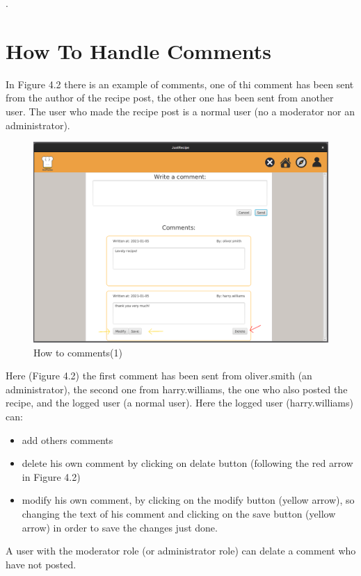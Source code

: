 \documentclass[a4paper]{report}
\begin{document}
\newpage
.
\newpage
\section{How To Handle Comments}
In Figure 4.2 there is an example of comments, one of thi comment has been sent from the author of the recipe post, the other one has been sent from another user. The user who made the recipe post is a normal user (no a moderator nor  an administrator).
\begin{figure}[htpb]
	\centering
	\includegraphics[scale=0.37]{img/user_manual/comment1.png}
	\caption{How to comments(1)}
\end{figure}
Here (Figure 4.2) the first comment has been sent from oliver.smith (an administrator), the second one from harry.williams, the one who also posted the recipe, and the logged user (a normal user). Here the logged user (harry.williams) can:
\begin{itemize}
	\item add others comments
	\item delete his own comment by clicking on delate button (following the red arrow in Figure 4.2)
	\item modify his own comment, by clicking on the modify button (yellow arrow), so changing the text of his comment and clicking on the save button (yellow arrow) in order to save the changes just done.
\end{itemize}
A user with the moderator role (or administrator role) can delate a comment who have not posted.
\end{document}
